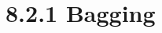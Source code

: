 \documentclass[aspectratio=169,usenames,dvipsnames]{beamer}
\newcommand{\InstructorList}[1]{
\begin{itemize}
	\color{orange}
	#1
\end{itemize}
}
\begin{document}










\section{8.2.1 Bagging}
\end{document}
